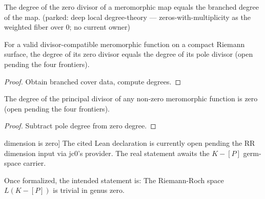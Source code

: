 \begin{lemma}
\label{lem:zero-divisor-degree-eq-branched-degree}
The degree of the zero divisor of a meromorphic map equals the branched degree of the map. (parked: deep local degree-theory — zeros-with-multiplicity as the weighted fiber over 0; no current owner)
\end{lemma}

\begin{lemma}
\label{lem:zeros-degree-eq-poles-degree}
\notready
For a valid divisor-compatible meromorphic function on a compact Riemann surface, the degree of its zero divisor equals the degree of its pole divisor (open pending the four frontiers).
\end{lemma}
\begin{proof}
Obtain branched cover data, compute degrees.
\end{proof}

\begin{lemma}
\label{lem:principal-divisor-degree-is-zero}
\notready
The degree of the principal divisor of any non-zero meromorphic function is zero (open pending the four frontiers).
\end{lemma}
\begin{proof}
Subtract pole degree from zero degree.
\end{proof}

\begin{theorem}[Genus zero Riemann-Roch \(K-[P]\) dimension is zero]
\label{thm:genus-zero-riemann-roch-k-minus-p}
The cited Lean declaration is currently open pending the RR dimension input via
jc0's  provider. The
real statement awaits the \(K-[P]\) germ-space carrier.

Once formalized, the intended statement is: The Riemann-Roch space \(L(K - [P])\) is trivial in genus zero.
\end{theorem}
